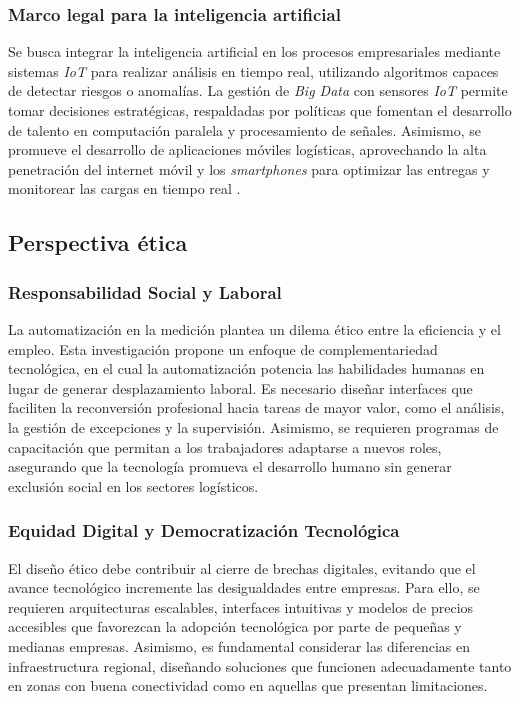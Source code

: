 \subsubsection{Marco legal para la inteligencia artificial}
Se busca integrar la inteligencia artificial en los procesos empresariales mediante sistemas \textit{IoT} para realizar análisis en tiempo real, utilizando algoritmos capaces de detectar riesgos o anomalías. La gestión de \textit{Big Data} con sensores \textit{IoT} permite tomar decisiones estratégicas, respaldadas por políticas que fomentan el desarrollo de talento en computación paralela y procesamiento de señales. Asimismo, se promueve el desarrollo de aplicaciones móviles logísticas, aprovechando la alta penetración del internet móvil y los \textit{smartphones} para optimizar las entregas y monitorear las cargas en tiempo real \cite{ArticleRef255131}.


\subsection{Perspectiva ética}
\subsubsection{Responsabilidad Social y Laboral}

La automatización en la medición plantea un dilema ético entre la eficiencia y el empleo. Esta investigación propone un enfoque de complementariedad tecnológica, en el cual la automatización potencia las habilidades humanas en lugar de generar desplazamiento laboral. Es necesario diseñar interfaces que faciliten la reconversión profesional hacia tareas de mayor valor, como el análisis, la gestión de excepciones y la supervisión. Asimismo, se requieren programas de capacitación que permitan a los trabajadores adaptarse a nuevos roles, asegurando que la tecnología promueva el desarrollo humano sin generar exclusión social en los sectores logísticos.
\subsubsection{Equidad Digital y Democratización Tecnológica}
El diseño ético debe contribuir al cierre de brechas digitales, evitando que el avance tecnológico incremente las desigualdades entre empresas. Para ello, se requieren arquitecturas escalables, interfaces intuitivas y modelos de precios accesibles que favorezcan la adopción tecnológica por parte de pequeñas y medianas empresas. Asimismo, es fundamental considerar las diferencias en infraestructura regional, diseñando soluciones que funcionen adecuadamente tanto en zonas con buena conectividad como en aquellas que presentan limitaciones.
